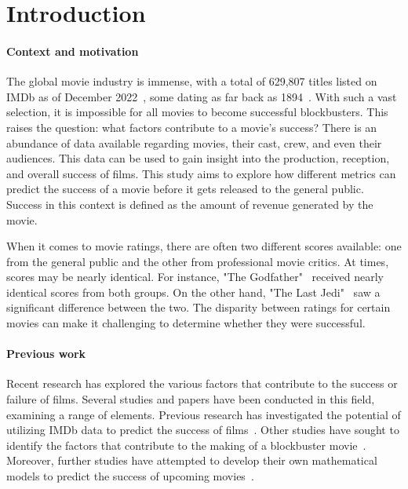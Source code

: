 \section{Introduction}
    \paragraph{Context and motivation}
        The global movie industry is immense, with a total of 629,807 titles listed on
            IMDb as of December 2022~\cite{imdbStats}, some dating as far back as
            1894~\cite{imdbOldest}.
        With such a vast selection, it is impossible for all movies to become
            successful blockbusters.
        This raises the question: what factors contribute to a movie's success?
        There is an abundance of data available regarding movies, their cast, crew, and
            even their audiences.
        This data can be used to gain insight into the production, reception, and
            overall success of films.
        This study aims to explore how different metrics can predict the success of a
            movie before it gets released to the general public.
        Success in this context is defined as the amount of revenue generated by the
            movie.

        When it comes to movie ratings, there are often two different scores available:
        one from the general public and the other from professional movie critics.
        At times, scores may be nearly identical.
        For instance, "The Godfather"~\cite{rottenTomatoesGodfather} received nearly
            identical scores from both groups.
        On the other hand, "The Last Jedi"~\cite{rottenTomatoesLastJedi} saw a
            significant difference between the two.
        The disparity between ratings for certain movies can make it challenging to
            determine whether they were successful.

    \paragraph{Previous work}
        Recent research has explored the various factors that contribute to the success
            or failure of films.
        Several studies and papers have been conducted in this field, examining a range
            of elements.
        Previous research has investigated the potential of utilizing IMDb data to
            predict the success of films~\cite{dhirRaj}.
        Other studies have sought to identify the factors that contribute to the making
            of a blockbuster movie~\cite{collinsHandSnell}.
        Moreover, further studies have attempted to develop their own mathematical
            models to predict the success of upcoming
            movies~\cite{ahmadDuraisamyYousefBuckles}.

